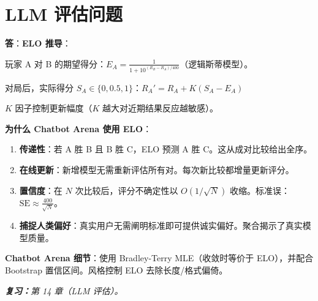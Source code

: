 \section{LLM 评估问题}
\label{llm-evaluation-questions}

\begin{questionbox}
\textbf{答}：\textbf{ELO 推导}：

玩家 A 对 B 的期望得分：$E_A = \frac{1}{1 + 10^{(R_B - R_A)/400}}$（逻辑斯蒂模型）。

对局后，实际得分 $S_A \in \{0, 0.5, 1\}$：$R_A' = R_A + K(S_A - E_A)$

$K$ 因子控制更新幅度（$K$ 越大对近期结果反应越敏感）。

\textbf{为什么 Chatbot Arena 使用 ELO}：

\begin{enumerate}
  \item \textbf{传递性}：若 A 胜 B 且 B 胜 C，ELO 预测 A 胜 C。这从成对比较给出全序。
  \item \textbf{在线更新}：新增模型无需重新评估所有对。每次新比较都增量更新评分。
  \item \textbf{置信度}：在 $N$ 次比较后，评分不确定性以 $O(1/\sqrt{N})$ 收缩。标准误：$\text{SE} \approx \frac{400}{\sqrt{N}}$。
  \item \textbf{捕捉人类偏好}：真实用户无需阐明标准即可提供诚实偏好。聚合揭示了真实模型质量。
\end{enumerate}

\textbf{Chatbot Arena 细节}：使用 Bradley-Terry MLE（收敛时等价于 ELO），并配合 Bootstrap 置信区间。风格控制 ELO 去除长度/格式偏倚。

\emph{\textbf{复习：}第 14 章（LLM 评估）。}
\end{questionbox}

